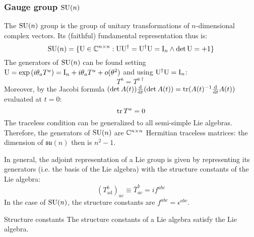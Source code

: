 \subsubsection{Gauge group \texorpdfstring{$ \mathrm{SU}(n) $}{SU(n)}}

The $ \mathrm{SU}(n) $ group is the group of unitary transformations of $ n $-dimensional complex vectors. Its (faithful) fundamental representation thus is:
\begin{equation*}
  \mathrm{SU}(n) = \{\mathrm{U} \in \mathbb{C}^{n \times n} : \mathrm{U}\mathrm{U}^\dagger = \mathrm{U}^\dagger\mathrm{U} = \mathrm{I}_n \land \det{\mathrm{U}} = +1 \}
\end{equation*}
The generators of $ \mathrm{SU}(n) $ can be found setting $ \mathrm{U} = \exp \left( i \theta_a T^a \right) = \mathrm{I}_n + i \theta_a T^a + o(\theta^2) $ and using $ \mathrm{U}^\dagger\mathrm{U} = \mathrm{I}_n $:
\begin{equation}
  T^a = T^{a\dagger}
  \label{eq:sun-herm}
\end{equation}
Moreover, by the Jacobi formula $ (\det A(t)) \frac{\mathrm{d}}{\mathrm{d} t} (\det A(t)) = \operatorname{tr} (A(t)^{-1} \frac{\mathrm{d}}{\mathrm{d} t} A(t)) $ evaluated at $ t = 0 $:
\begin{equation}
  \operatorname{tr} T^a = 0
  \label{eq:sun-trace}
\end{equation}
The traceless condition can be generalized to all semi-simple Lie algebras.
Therefore, the generators of $ \mathrm{SU}(n) $ are $ \mathbb{C}^{n \times n} $ Hermitian traceless matrices: the dimension of $ \mathfrak{su}(n) $ then is $ n^2 - 1 $.

In general, the adjoint representation of a Lie group is given by representing its generators (i.e. the basis of the Lie algebra) with the structure constants of the Lie algebra:
\begin{equation}
  (T^b_\text{ad})_{ac} \equiv \bar{T}^b_{ac} = i f^{abc}
\end{equation}
In the case of $ \mathrm{SU}(n) $, the structure constants are $ f^{abc} = \epsilon^{abc} $.

\begin{proposition}{Structure constants}{}
  The structure constants of a Lie algebra satisfy the Lie algebra.
\end{proposition}

